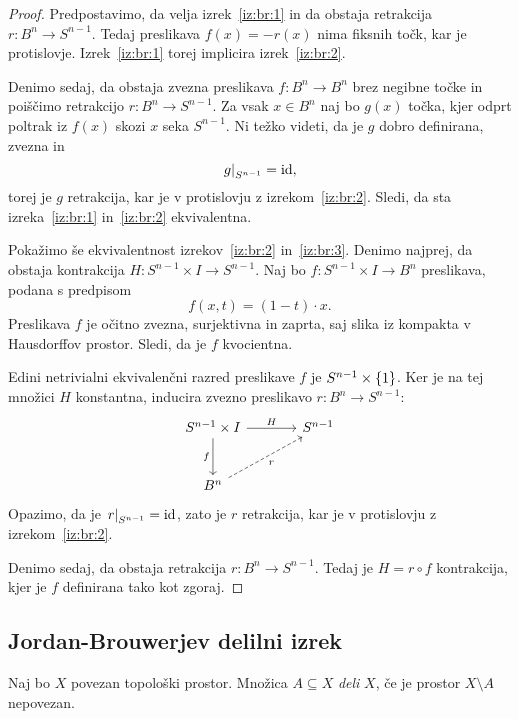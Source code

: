 \begin{proof}
Predpostavimo, da velja izrek~\ref{iz:br:1} in da obstaja
retrakcija $r \colon B^n \to S^{n-1}$. Tedaj preslikava
$f(x) = -r(x)$ nima fiksnih točk, kar je protislovje.
Izrek~\ref{iz:br:1} torej implicira izrek~\ref{iz:br:2}.


Denimo sedaj, da obstaja zvezna preslikava $f \colon B^n \to B^n$
brez negibne točke in poiščimo retrakcijo
$r \colon B^n \to S^{n-1}$. Za vsak $x \in B^n$ naj bo $g(x)$
točka, kjer odprt poltrak iz $f(x)$ skozi $x$ seka $S^{n-1}$. Ni
težko videti, da je $g$ dobro definirana, zvezna in
\[
\left. g\right|_{S^{n-1}}^{} = \operatorname{id},
\]
torej je $g$ retrakcija, kar je v protislovju z
izrekom~\ref{iz:br:2}. Sledi, da sta izreka~\ref{iz:br:1}
in~\ref{iz:br:2} ekvivalentna.

Pokažimo še ekvivalentnost izrekov~\ref{iz:br:2} in~\ref{iz:br:3}.
Denimo najprej, da obstaja kontrakcija
$H \colon S^{n-1} \times I \to S^{n-1}$. Naj bo
$f \colon S^{n-1} \times I \to B^n$ preslikava, podana s predpisom
\[
f(x, t) = (1-t) \cdot x.
\]
Preslikava $f$ je očitno zvezna, surjektivna in zaprta, saj slika
iz kompakta v Hausdorffov prostor. Sledi, da je $f$ kvocientna.

Edini netrivialni ekvivalenčni razred preslikave $f$ je
$S^{n-1} \times \left\{1\right\}$. Ker je na tej množici $H$ konstantna,
inducira zvezno preslikavo $r \colon B^n \to S^{n-1}$:
\[
\begin{tikzcd}[column sep=large, row sep=large]
S^{n-1} \times I \arrow[r, "H"] \arrow[d, "f"'] & S^{n-1} \\
B^n \arrow[ur, dashrightarrow, "r"']            &
\end{tikzcd}
\]
Opazimo, da je $\left. r\right|_{S^{n-1}}^{} = \operatorname{id}$, zato je $r$ retrakcija,
kar je v protislovju z izrekom~\ref{iz:br:2}.

Denimo sedaj, da obstaja retrakcija $r \colon B^n \to S^{n-1}$.
Tedaj je $H = r \circ f$ kontrakcija, kjer je $f$ definirana tako
kot zgoraj.
\end{proof}

\newpage

\subsection{Jordan-Brouwerjev delilni izrek}


\begin{definicija}
Naj bo $X$ povezan topološki prostor. Množica $A \subseteq X$
\emph{deli} $X$, če je prostor $X \setminus A$ nepovezan.
\end{definicija}

